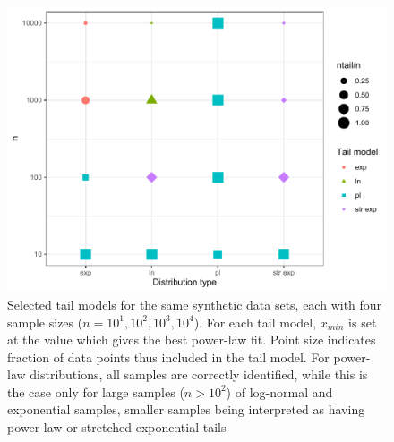 \documentclass[
  12pt,
]{book}
\begin{document}
\begin{figure}

{\centering \includegraphics[width=0.9\linewidth]{bookdown-demo_files/figure-latex/05-tails-1} 

}

\caption{Selected tail models for the same synthetic data sets, each with four sample sizes (\(n=10^1, 10^2, 10^3, 10^4\)). For each tail model, \(x_{min}\) is set at the value which gives the best power-law fit. Point size indicates fraction of data points thus included in the tail model. For power-law distributions, all samples are correctly identified, while this is the case only for large samples (\(n>10^2\)) of log-normal and exponential samples, smaller samples being interpreted as having power-law or stretched exponential tails}\label{fig:05-tails}
\end{figure}
\end{document}
